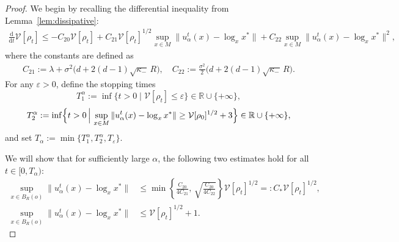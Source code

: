 \documentclass[11pt]{amsart}
\newcommand{\p}{o}%
\begin{document}
\begin{proof}
We begin by recalling the differential inequality from Lemma~\ref{lem:dissipative}:
\begin{align}\label{eq: calV}
\frac{\mathrm{d}}{\mathrm{d} t}\mathcal{V}[\rho_t]
 \leq  -C_{20}\mathcal{V}[\rho_t]  
      + C_{21}\mathcal{V}[\rho_t]^{1/2}\sup_{x\in M}\|u_\alpha^t(x)-\log_x x^*\|  
      + C_{22} \sup_{x\in M}\|u_\alpha^t(x)-\log_x x^*\|^2,
\end{align}
where the constants are defined as
\begin{align*}
   C_{21} := \lambda + \sigma^2 \bigl(d+2(d-1)\sqrt{\kappa_-}\, R\bigr), \quad  C_{22} := \frac{\sigma^2}{2} \bigl(d+2(d-1)\sqrt{\kappa_-}\, R\bigr).
\end{align*}
For any $\varepsilon > 0$, define the stopping times
\[
T^\alpha_1 := \inf\bigl\{t > 0 \mid \mathcal{V}[\rho_t] \leq \varepsilon \bigr\} \in \mathbb{R} \cup \{+\infty\},
\]
\[
T^\alpha_2 :=\inf\Bigl\{t > 0 \,\Big|\, \sup_{x\in M}\|u_\alpha^t(x) - \log_x x^*\| \geq \mathcal{V}[\rho_0]^{1/2} + 3 \Bigr\} \in \mathbb{R} \cup \{+\infty\},
\]
and set $T_\alpha := \min\{T^\alpha_1, T^\alpha_2, T_\varepsilon\}$.

We will show that for sufficiently large $\alpha$, the following two estimates hold for all $t \in [0, T_\alpha)$:
\begin{align}\label{goal1}
    \sup_{x\in B_R(\p)}\|u_\alpha^t(x) - \log_x x^*\| 
    &\leq \min\!\left\{\frac{C_{20}}{4C_{21}},\, \sqrt{\frac{C_{20}}{4C_{22}}}\right\} \mathcal{V}[\rho_t]^{1/2}
    =: C_* \mathcal{V}[\rho_t]^{1/2},
\\[1ex]\label{goal2}
    \sup_{x\in B_R(\p)}\|u_\alpha^t(x) - \log_x x^*\| 
    &\leq \mathcal{V}[\rho_t]^{1/2} + 1.
\end{align}


\end{proof}
\end{document}
